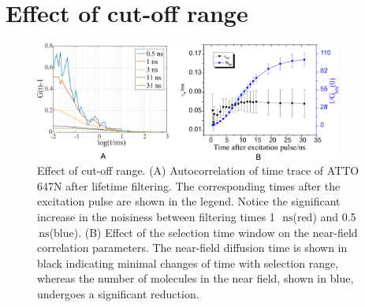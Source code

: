 \documentclass[11pt,a4paper,onecolumn]{article}
\newcommand{\ns}{\ensuremath{\,\textrm{ns}}}
\begin{document}
\section{Effect of cut-off range}
\begin{figure}[ht]
  \centering
  \includegraphics[width=0.9\textwidth]{cutoff_effect.png}
  \makeatletter
  \renewcommand{\fnum@figure}{\figurename~S\thefigure}
  \makeatother{}
  \caption{Effect of cut-off range. (A) Autocorrelation of time trace of ATTO 647N after lifetime filtering. The corresponding times after the excitation pulse are shown in the legend. Notice the significant increase in the noisiness between filtering times 1~\ns (red) and 0.5~\ns (blue). (B) Effect of the selection time window on the near-field correlation parameters. The near-field diffusion time is shown in black indicating minimal changes of time with selection range, whereas the number of molecules in the near field, shown in blue, undergoes a significant reduction.}
  \label{SIfig:cutoff-effect}
\end{figure}
\end{document}
